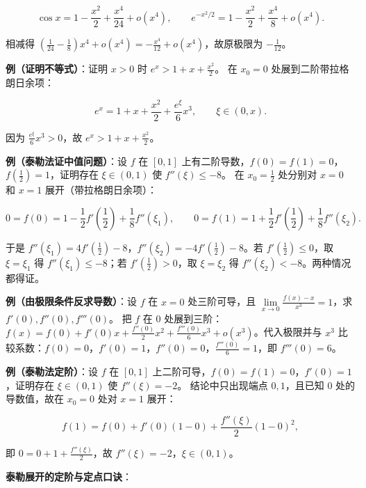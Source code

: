 \documentclass[11pt,openany,UTF8]{ctexbook}
\begin{document}
\[\cos x=1-\frac{x^2}{2}+\frac{x^4}{24}+o(x^4),\qquad
e^{-x^2/2}=1-\frac{x^2}{2}+\frac{x^4}{8}+o(x^4).\]

相减得 $\left(\frac{1}{24}-\frac18\right)x^4+o(x^4)=-\frac{x^4}{12}+o(x^4)$，故原极限为 $-\frac{1}{12}$。

\textbf{例（证明不等式）}：证明 $x>0$ 时 $e^x>1+x+\frac{x^2}{2}$。 在 $x_0=0$ 处展到二阶带拉格朗日余项：

\[e^x=1+x+\frac{x^2}{2}+\frac{e^{\xi}}{6}x^3,\qquad \xi\in(0,x).\]

因为 $\frac{e^{\xi}}{6}x^3>0$，故 $e^x>1+x+\frac{x^2}{2}$。

\textbf{例（泰勒法证中值问题）}：设 $f$ 在 $[0,1]$ 上有二阶导数，$f(0)=f(1)=0$，$f\left(\frac12\right)=1$，证明存在 $\xi\in(0,1)$ 使 $f''(\xi)\le-8$。 在 $x_0=\frac12$ 处分别对 $x=0$ 和 $x=1$ 展开（带拉格朗日余项）：

\[0=f(0)=1-\frac12f'\!\left(\frac12\right)+\frac{1}{8}f''(\xi_1),\qquad
0=f(1)=1+\frac12f'\!\left(\frac12\right)+\frac{1}{8}f''(\xi_2).\]

于是 $f''(\xi_1)=4f'\!\left(\frac12\right)-8$，$f''(\xi_2)=-4f'\!\left(\frac12\right)-8$。若 $f'\!\left(\frac12\right)\le0$，取 $\xi=\xi_1$ 得 $f''(\xi_1)\le-8$；若 $f'\!\left(\frac12\right)>0$，取 $\xi=\xi_2$ 得 $f''(\xi_2)<-8$。两种情况都得证。

\textbf{例（由极限条件反求导数）}：设 $f$ 在 $x=0$ 处三阶可导，且 $\lim\limits_{x\to0}\frac{f(x)-x}{x^3}=1$，求 $f'(0),f''(0),f'''(0)$。 把 $f$ 在 0 处展到三阶：$f(x)=f(0)+f'(0)x+\frac{f''(0)}{2}x^2+\frac{f'''(0)}{6}x^3+o(x^3)$。代入极限并与 $x^3$ 比较系数：$f(0)=0$，$f'(0)=1$，$f''(0)=0$，$\frac{f'''(0)}{6}=1$，即 $f'''(0)=6$。

\textbf{例（泰勒法定阶）}：设 $f$ 在 $[0,1]$ 上二阶可导，$f(0)=f(1)=0$，$f'(0)=1$，证明存在 $\xi\in(0,1)$ 使 $f''(\xi)=-2$。 结论中只出现端点 $0,1$，且已知 $0$ 处的导数值，故在 $x_0=0$ 处对 $x=1$ 展开：

\[f(1)=f(0)+f'(0)(1-0)+\frac{f''(\xi)}{2}(1-0)^2,\]

即 $0=0+1+\frac{f''(\xi)}{2}$，故 $f''(\xi)=-2$，$\xi\in(0,1)$。

\textbf{泰勒展开的定阶与定点口诀}：
\end{document}
